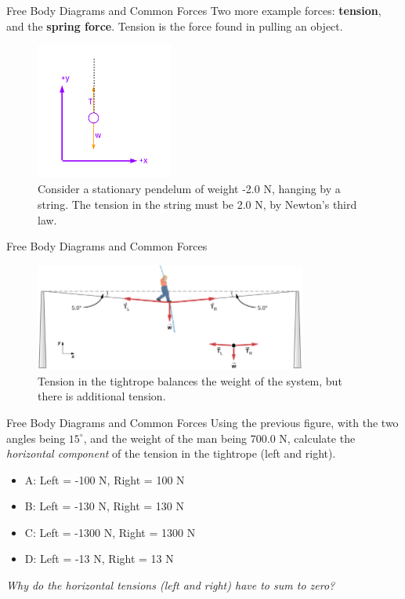 \documentclass{beamer}
\begin{document}
\begin{frame}{Free Body Diagrams and Common Forces}
\small
Two more example forces: \textbf{\alert{tension}}, and the \textbf{\alert{spring force}}.  Tension is the force found in pulling an object.
\begin{figure}
\centering
\includegraphics[width=0.4\textwidth]{figures/pend.pdf}
\caption{\label{fig:pend}  Consider a stationary pendelum of weight -2.0 N, hanging by a string.  The tension in the string must be 2.0 N, by Newton's third law.}
\end{figure}
\end{frame}

\begin{frame}{Free Body Diagrams and Common Forces}
\begin{figure}
\centering
\includegraphics[width=0.8\textwidth]{figures/tightrope.png}
\caption{\label{fig:tightrope} Tension in the tightrope balances the weight of the system, but there is additional tension.}
\end{figure}
\end{frame}

\begin{frame}{Free Body Diagrams and Common Forces}
Using the previous figure, with the two angles being $15^{\circ}$, and the weight of the man being 700.0 N, calculate the \textit{horizontal component} of the tension in the tightrope (left and right).
\begin{itemize}
\item A: Left = -100 N, Right = 100 N
\item B: Left = -130 N, Right = 130 N
\item C: Left = -1300 N, Right = 1300 N
\item D: Left = -13 N, Right = 13 N
\end{itemize}
\textit{Why do the horizontal tensions (left and right) have to sum to zero?}
\end{frame}
\end{document}
